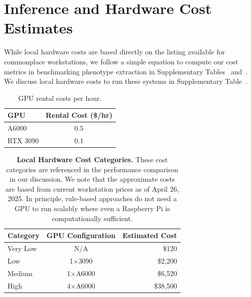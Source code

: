
\section*{Inference and Hardware Cost Estimates}\label{appendix: cost calculations}
 While local hardware costs are based directly on the listing available for commonplace workstations, we follow a simple equation to compute our cost metrics in benchmarking phenotype extraction in Supplementary Tables~\sTabGpuCosts{} and~\sTabCostCalc. We discuss local hardware costs to run these systems in Supplementary Table~\sTabCostCategories. 

\begin{table}[h]
\centering
\begin{tabular}{|l|c|}
\hline
\textbf{GPU} & \textbf{Rental Cost (\$/hr)} \\
\hline
A6000 & 0.5 \\
\hline
RTX 3090 & 0.1 \\
\hline
\end{tabular}
\caption{GPU rental costs per hour.}
\label{tab:gpu_costs}
\end{table}

\begin{table}[ht]
\centering
\begin{tabular}{lcr}
\hline
\textbf{Category} & \textbf{GPU Configuration} & \textbf{Estimated Cost} \\
\hline
Very Low & N/A & \$120 \\
Low & 1$\times$3090 & \$2,200 \\
Medium & 1$\times$A6000 & \$6,520 \\
High & 4$\times$A6000 & \$38,500 \\
\hline
\end{tabular}
\caption{\textbf{Local Hardware Cost Categories.} These cost categories are referenced in the performance comparison in our discussion. We note that the approximate costs are based from current workstation prices \cite{newegg_3d5} \cite{newegg_velztorm} \cite{thinkmate_gpx} as of April 26, 2025. In principle, rule-based approaches do not need a GPU to run scalably where even a Raspberry Pi is computationally sufficient.}
\label{tab:cost_categories}
\end{table}


